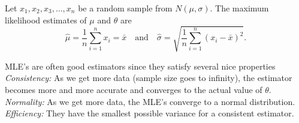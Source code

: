   \bigskip

\bbox
  \begin{theorem}
    Let $x_1, x_2, x_3, \ldots, x_n$ be a random sample from $N(\mu, \sigma)$. The maximum likelihood estimates of $\mu$ and $\theta$ are
    \[ \hat{\mu} = \frac{1}{n} \sum_{i=1}^n x_i = \bar{x} \ \ \ \mbox{ and } \ \ \ \hat{\sigma} = \sqrt{\frac{1}{n} \sum_{i=1}^n (x_i - \bar{x})^2}.\]
  \end{theorem}
  \ebox

\bigskip


\bbox
\bi
\ii {}
\ii MLE's are often good estimators since they satisfy several nice properties
\bi
\ii \textit{Consistency:}  As we get more data (sample size goes to infinity), the estimator becomes more and
more accurate and converges to the actual value of $\theta$.
\ii \textit{Normality:} As we get more data, the MLE's converge to a normal distribution.
\ii \textit{Efficiency:} They have the smallest possible variance for a consistent estimator.
\ei
\ii {}
\ei
\ebox


 
